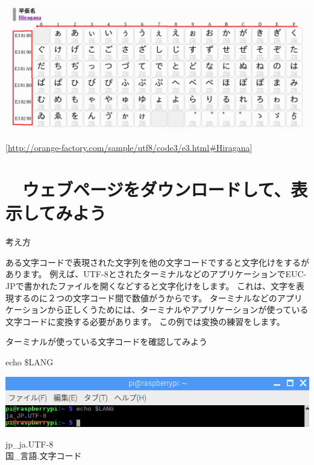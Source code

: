 \bigskip



\begin{center}
\includegraphics[width=\textwidth]{./text08-img/textbook-img018.png}

\end{center}

\bigskip

[\url{http://orange-factory.com/sample/utf8/code3/e3.html#Hiragana}]
\clearpage\section{\theExercise　ウェブページをダウンロードして、表示してみよう}
\addtocounter{Exercise}{-1}\label{E:iconv1}
考え方

ある文字コードで表現された文字列を他の文字コードですると文字化けをするがあります。
例えば、UTF-8とされたターミナルなどのアプリケーションでEUC-JPで書かれたファイルを開くなどすると文字化けをします。
これは、文字を表現するのに２つの文字コード間で数値がうからです。
ターミナルなどのアプリケーションから正しくうためには、ターミナルやアプリケーションが使っている文字コードに変換する必要があります。
この例では変換の練習をします。

ターミナルが使っている文字コードを確認してみよう

echo \$LANG


\begin{center}
\includegraphics[width=\textwidth]{./text08-img/textbook-img019.png}



\end{center}
jp\_ja.UTF-8\\
国\_言語.文字コード

